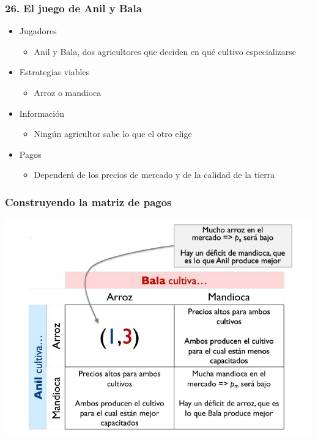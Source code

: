 \documentclass{beamer}
\begin{document}
\begin{frame}
\frametitle{26. El juego de Anil y Bala}
\begin{itemize}
    \item Jugadores
        \begin{itemize}
        \item Anil y Bala, dos agricultores que deciden en qué cultivo especializarse
        \end{itemize}
    \item Estrategias viables
        \begin{itemize}
        \item Arroz o mandioca
        \end{itemize}
    \item Información
        \begin{itemize}
        \item Ningún agricultor sabe lo que el otro elige
        \end{itemize}
    \item Pagos
        \begin{itemize}
        \item Dependerá de los precios de mercado y de la calidad de la tierra
        \end{itemize}
\end{itemize}
\end{frame}

\begin{frame}
\frametitle{ Construyendo la matriz de pagos}
\centering
\includegraphics[scale=0.6]{Figures/Tema_03_8_bala.jpg}
\end{frame}
\end{document}
